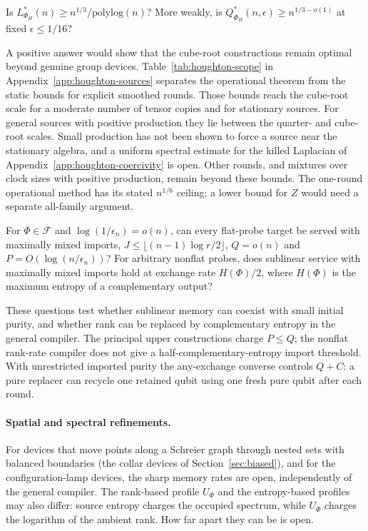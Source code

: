 \begin{problem}\label{prob:houghton}
Is $L^*_{\Phi_H}(n)\geq n^{1/3}/\mathrm{polylog}(n)$? More weakly,
is $Q^*_{\Phi_H}(n,\epsilon)\geq n^{1/3-o(1)}$ at fixed
$\epsilon\leq1/16$?
\end{problem}

A positive answer would show that the cube-root constructions remain
optimal beyond genuine group devices. Table~\ref{tab:houghton-scope} in Appendix~\ref{app:houghton-sources}
separates the operational theorem from the static bounds for explicit
smoothed rounds. Those bounds reach the cube-root scale for a moderate
number of tensor copies and for stationary sources. For general sources
with positive production they lie between the quarter- and cube-root
scales. Small production has not been shown to force a source near the
stationary algebra, and a uniform spectral estimate for the killed
Laplacian of Appendix~\ref{app:houghton-coercivity} is open. Other
rounds, and mixtures over clock sizes with positive production, remain
beyond these bounds. The one-round operational method has its stated
$n^{1/6}$ ceiling; a lower bound for $Z$ would need a separate
all-family argument.

\begin{problem}\label{prob:closure-purity}
For $\Phi\in\overline{\mathcal F}$ and
$\log(1/\epsilon_n)=o(n)$, can every flat-probe target be served
with maximally mixed imports, $J\leq\lfloor(n-1)\log r/2\rfloor$,
$Q=o(n)$ and $P=O(\log(n/\epsilon_n))$?
For arbitrary nonflat probes, does sublinear service with maximally
mixed imports hold at exchange rate $H(\Phi)/2$, where $H(\Phi)$
is the maximum entropy of a complementary output?
\end{problem}

These questions test whether sublinear memory can coexist with small
initial purity, and whether rank can be replaced by complementary
entropy in the general compiler. The principal upper constructions charge $P\leq Q$;
the nonflat rank-rate compiler does not give a half-complementary-entropy
import threshold. With unrestricted imported purity the any-exchange
converse controls $Q+C$: a pure replacer can recycle one retained
qubit using one fresh pure qubit after each round.

\paragraph{Spatial and spectral refinements.}
For devices that move points along a Schreier graph through nested sets
with balanced boundaries (the collar devices of Section~\ref{sec:biased}),
and for the configuration-lamp devices, the sharp memory rates are
open, independently of the general compiler. The rank-based profile
$U_\Phi$ and the entropy-based profiles may also differ: source entropy
charges the occupied spectrum, while $U_\Phi$ charges the logarithm of
the ambient rank. How far apart they can be is open.

